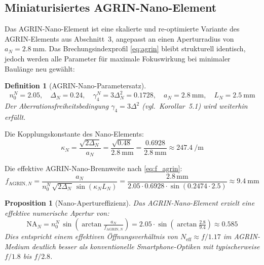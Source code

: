﻿\documentclass[12pt,a4paper]{article}
\newtheorem{definition}[theorem]{Definition}
\newtheorem{proposition}[theorem]{Proposition}
\theoremstyle{definition}
\newcommand{\eff}{\mathrm{eff}}
\newcommand{\AGRIN}{\mathrm{AGRIN}}
\begin{document}
	\subsection{Miniaturisiertes AGRIN-Nano-Element}

	Das AGRIN-Nano-Element ist eine skalierte und re-optimierte Variante des
	AGRIN-Elements aus Abschnitt~3, angepasst an einen Aperturradius von
	$a_N = \SI{2.8}{\milli\metre}$.  Das Brechungsindexprofil \eqref{eq:agrin}
	bleibt strukturell identisch, jedoch werden alle Parameter f\"ur maximale
	Fokuswirkung bei minimaler Baulänge neu gew\"ahlt:

	\begin{definition}[AGRIN-Nano-Parametersatz]
		\begin{equation}
			n_0^N = 2.05,\quad
			\Delta_N = 0.24,\quad
			\gamma_4^N = 3\Delta_N^2 = 0.1728,\quad
			a_N = \SI{2.8}{\milli\metre},\quad
			L_N = \SI{2.5}{\milli\metre}
			\label{eq:agrin_nano_params}
		\end{equation}
		Der Aberrationsfreiheitsbedingung $\gamma_4 = 3\Delta^2$ (vgl.\
		Korollar~5.1) wird weiterhin erf\"ullt.
	\end{definition}

	Die Kopplungskonstante des Nano-Elements:
	\begin{equation}
		\kappa_N = \frac{\sqrt{2\Delta_N}}{a_N}
		= \frac{\sqrt{0.48\,}}{\SI{2.8}{\milli\metre}}
		= \frac{0.6928}{\SI{2.8}{\milli\metre}}
		\approx \SI{247.4}{\per\metre}
		\label{eq:kappa_nano}
	\end{equation}

	Die effektive AGRIN-Nano-Brennweite nach \eqref{eq:f_agrin}:
	\begin{equation}
		f_{\AGRIN,N}
		= \frac{a_N}{n_0^N\,\sqrt{2\Delta_N}\,
			\sin\!\left(\kappa_N L_N\right)}
		= \frac{2.8\,\mathrm{mm}}{2.05\cdot 0.6928\cdot
			\sin(0.2474\cdot 2.5)}
		\approx \SI{9.4}{\milli\metre}
		\label{eq:fagrin_nano}
	\end{equation}

	\begin{proposition}[Nano-Apertureffizienz]
		Das AGRIN-Nano-Element erzielt eine effektive numerische Apertur von:
		\begin{equation}
			\mathrm{NA}_N
			= n_0^N\,\sin\!\left(\arctan\tfrac{a_N}{f_{\AGRIN,N}}\right)
			= 2.05\cdot\sin\!\left(\arctan\tfrac{2.8}{9.4}\right)
			\approx 0.585
			\label{eq:na_nano}
		\end{equation}
		Dies entspricht einem effektiven \"Offnungsverh\"altnis von
		$N_\eff \approx f/1.17$ im AGRIN-Medium \textemdash deutlich besser als
		konventionelle Smartphone-Optiken mit typischerweise $f/1.8$
		bis $f/2.8$.
	\end{proposition}
\end{document}
